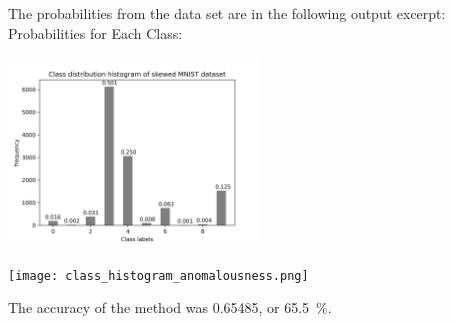 
The probabilities from the data set are in the following output excerpt:
Probabilities for Each Class:

\begin{center}    
\includegraphics[width=0.5\textwidth]{class_histogram.png}
\end{center}    


\begin{center}    
\texttt{[image: class\_histogram\_anomalousness.png]}
\end{center}
The accuracy of the method was 0.65485, or 65.5~\%.

